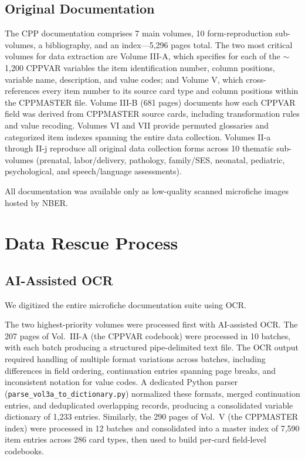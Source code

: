 \documentclass[12pt]{article}
\begin{document}
\subsection{Original Documentation}

The CPP documentation comprises 7 main volumes, 10 form-reproduction sub-volumes, a bibliography, and an index---5,296 pages total. The two most critical volumes for data extraction are Volume III-A, which specifies for each of the $\sim$1,200 CPPVAR variables the item identification number, column positions, variable name, description, and value codes; and Volume V, which cross-references every item number to its source card type and column positions within the CPPMASTER file. Volume III-B (681 pages) documents how each CPPVAR field was derived from CPPMASTER source cards, including transformation rules and value recoding. Volumes VI and VII provide permuted glossaries and categorized item indexes spanning the entire data collection. Volumes II-a through II-j reproduce all original data collection forms across 10 thematic sub-volumes (prenatal, labor/delivery, pathology, family/SES, neonatal, pediatric, psychological, and speech/language assessments).

All documentation was available only as low-quality scanned microfiche images hosted by NBER.

\section{Data Rescue Process}

\subsection{AI-Assisted OCR}

We digitized the entire microfiche documentation suite using OCR.

The two highest-priority volumes were processed first with AI-assisted OCR. The 207 pages of Vol.\ III-A (the CPPVAR codebook) were processed in 10 batches, with each batch producing a structured pipe-delimited text file. The OCR output required handling of multiple format variations across batches, including differences in field ordering, continuation entries spanning page breaks, and inconsistent notation for value codes. A dedicated Python parser (\texttt{parse\_vol3a\_to\_dictionary.py}) normalized these formats, merged continuation entries, and deduplicated overlapping records, producing a consolidated variable dictionary of 1,233 entries. Similarly, the 290 pages of Vol.\ V (the CPPMASTER index) were processed in 12 batches and consolidated into a master index of 7,590 item entries across 286 card types, then used to build per-card field-level codebooks.
\end{document}
